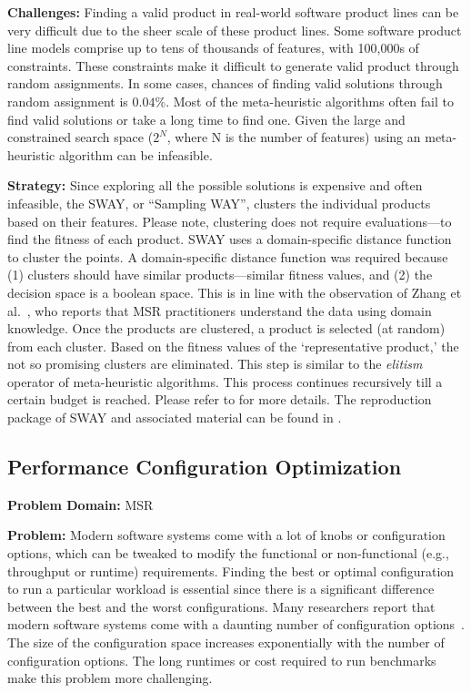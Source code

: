 \documentclass[sigconf,anonymous,review]{acmart}
\newcommand\TODO[1]{\textcolor{ScarletRed}{\textbf{\colorbox{yellow}{\small TODO:}} \emph{#1}}\xspace}
\begin{document}
\noindent\textbf{Challenges: } Finding a valid product in real-world software product lines can be very difficult due to the sheer scale of these product lines. Some software product line models comprise up to tens of thousands
of features,  with 100,000s of constraints. These constraints make it difficult to generate valid product through random assignments. In some cases, chances of finding valid solutions through random assignment is $0.04\%$. Most of the meta-heuristic algorithms often fail to find valid solutions or take a long time to find one. Given the large and constrained search space ($2^N$, where N is the number of features) using an meta-heuristic 
algorithm can be infeasible.

\noindent\textbf{Strategy:} Since exploring all the possible solutions is expensive and often infeasible, the SWAY, or ``Sampling WAY'', clusters the individual products based on their features. Please note, clustering does not require evaluations---to find the fitness of each product. SWAY uses a domain-specific distance function to cluster the points. A domain-specific distance function was required because (1) clusters should have similar products---similar fitness values, and (2) the decision space is a boolean space. This is in line with the observation of Zhang et al.~\cite{zhang2013software}, who reports that MSR practitioners understand the data using domain knowledge. Once the products are clustered, a product is selected (at random) from each cluster. Based on the fitness values of the `representative product,' the not so promising clusters are eliminated. This step is similar to the \textit{elitism} operator of meta-heuristic algorithms. This process continues recursively till a certain budget is reached. Please refer to \cite{nair2016accidental, chen2017beyond, chen2017sampling} for more details. The reproduction package of SWAY and associated material can be found in .

    \subsection{Performance Configuration Optimization}
\noindent\textbf{Problem Domain: } MSR

\noindent\textbf{Problem: } Modern software systems come with a lot of knobs or configuration options, which can be tweaked to modify the functional or non-functional (e.g., throughput or runtime) requirements. Finding the best or optimal configuration to run a particular workload is essential since there is a significant difference between the best and the worst configurations. Many researchers report that modern software systems come with a daunting number of configuration options~\cite{xu2015hey}. The size of the configuration space increases exponentially with the number of configuration options. The long runtimes or cost required to run benchmarks make this problem more challenging.
\end{document}
